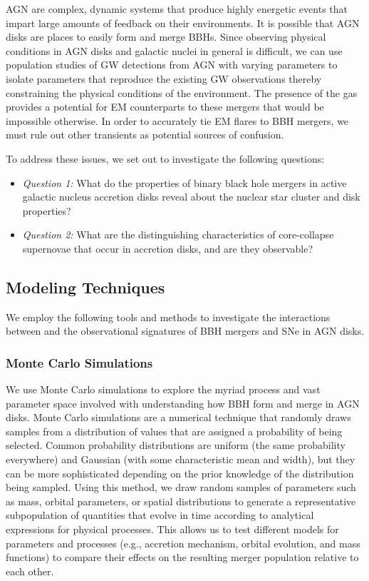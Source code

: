 AGN are complex, dynamic systems that produce highly energetic events that impart large amounts of feedback on their environments.
It is possible that AGN disks are places to easily form and merge BBHs.
Since observing physical conditions in AGN disks and galactic nuclei in general is difficult, we can use population studies of GW detections from AGN with varying parameters to isolate parameters that reproduce the existing GW observations thereby constraining the physical conditions of the environment.
The presence of the gas provides a potential for EM counterparts to these mergers that would be impossible otherwise.
In order to accurately tie EM flares to BBH mergers, we must rule out other transients as potential sources of confusion.

\noindent To address these issues, we set out to investigate the following questions:

\begin{itemize}
\item \emph{Question 1:} What do the properties of binary black hole mergers in active galactic nucleus accretion disks reveal about the nuclear star cluster and disk properties?

\item \emph{Question 2:} What are the distinguishing characteristics of core-collapse supernovae that occur in accretion disks, and are they observable?
\end{itemize}




\subsection{Modeling Techniques}

We employ the following tools and methods to investigate the interactions between and the observational signatures of BBH mergers and SNe in AGN disks.

\subsubsection{Monte Carlo Simulations}

We use Monte Carlo simulations to explore the myriad process and vast parameter space involved with understanding how BBH form and merge in AGN disks.
Monte Carlo simulations are a numerical technique that randomly draws samples from a distribution of values that are assigned a probability of being selected.
Common probability distributions are uniform (the same probability everywhere) and Gaussian (with some characteristic mean and width), but they can be more sophisticated depending on the prior knowledge of the distribution being sampled.
Using this method, we draw random samples of parameters such as mass, orbital parameters, or spatial distributions to generate a representative subpopulation of quantities that evolve in time according to analytical expressions for physical processes.
This allows us to test different models for parameters and processes (e.g., accretion mechanism, orbital evolution, and mass functions) to compare their effects on the resulting merger population relative to each other.

